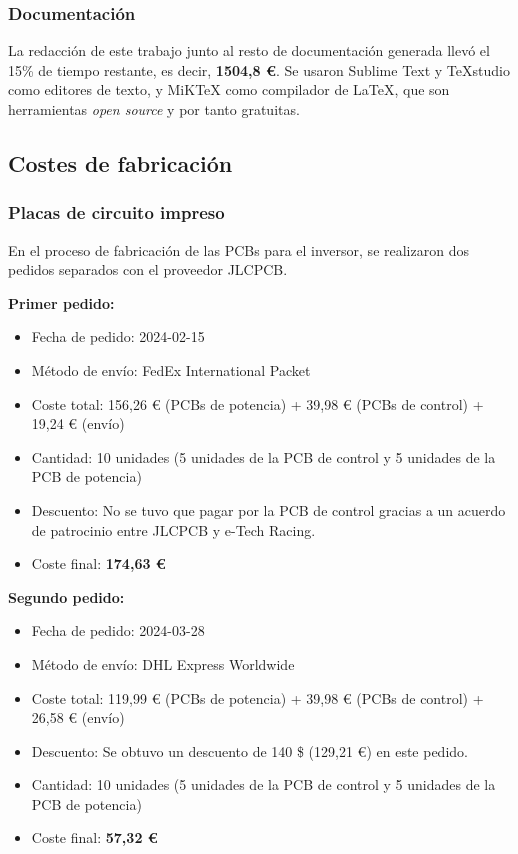 \subsubsection{Documentación}
La redacción de este trabajo junto al resto de documentación generada llevó el 15\% de tiempo restante, es decir, \textbf{1504,8 \euro{}}. Se usaron Sublime Text y TeXstudio como editores de texto, y MiKTeX como compilador de \LaTeX, que son herramientas \textit{open source} y por tanto gratuitas.

\subsection{Costes de fabricación}

\subsubsection{Placas de circuito impreso}

En el proceso de fabricación de las PCBs para el inversor, se realizaron dos pedidos separados con el proveedor JLCPCB.

\textbf{Primer pedido:}
\begin{itemize}
	\item Fecha de pedido: 2024-02-15
	\item Método de envío: FedEx International Packet
	\item Coste total: 156,26 \euro{} (PCBs de potencia) + 39,98 \euro{} (PCBs de control) + 19,24 \euro{} (envío)
	\item Cantidad: 10 unidades (5 unidades de la PCB de control y 5 unidades de la PCB de potencia)
	\item Descuento: No se tuvo que pagar por la PCB de control gracias a un acuerdo de patrocinio entre JLCPCB y e-Tech Racing.
	\item Coste final: \textbf{174,63 \euro{}}

\end{itemize}

\hspace{1cm}

\textbf{Segundo pedido:}
\begin{itemize}
	\item Fecha de pedido: 2024-03-28
	\item Método de envío: DHL Express Worldwide
	\item Coste total: 119,99 \euro{} (PCBs de potencia) + 39,98 \euro{} (PCBs de control) + 26,58 \euro{} (envío)
	\item Descuento: Se obtuvo un descuento de 140 \$ (129,21 \euro{}) en este pedido.
	\item Cantidad: 10 unidades (5 unidades de la PCB de control y 5 unidades de la PCB de potencia)
	\item Coste final: \textbf{57,32 \euro{}}
\end{itemize}

